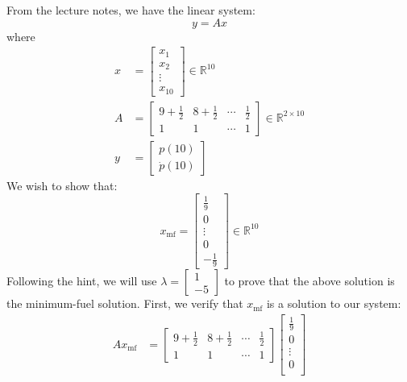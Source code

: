 \documentclass[12pt]{exam}
\begin{document}
\begin{questions}
\begin{solution}
    From the lecture notes, we have the linear system:
    \[
      y = Ax
    \]
    where 
    \begin{align*}
      x &=
        \begin{bmatrix}
          x_1 \\
          x_2 \\
          \vdots \\
          x_{10}
        \end{bmatrix} \in \mathbb{R}^{10}\\
      A &=
        \begin{bmatrix}
          9 + \frac{1}{2} & 8 + \frac{1}{2} & \cdots & \frac{1}{2} \\
          1 & 1 & \cdots & 1
        \end{bmatrix} \in \mathbb{R}^{2 \times 10} \\
      y &=
        \begin{bmatrix}
          p(10) \\
          \dot{p}(10)
        \end{bmatrix}
    \end{align*}
    We wish to show that:
    \[
      x_{\text{mf}} =
        \begin{bmatrix}
          \frac{1}{9} \\
          0 \\
          \vdots \\
          0 \\
          -\frac{1}{9}
        \end{bmatrix} \in \mathbb{R}^{10}
    \]
    Following the hint, we will use $\lambda = \begin{bmatrix} 1 \\ -5 \end{bmatrix}$ to prove that the above solution is the minimum-fuel solution. First, we verify that $x_{\text{mf}}$ is a solution to our system:
    \begin{align*}
      Ax_{\text{mf}} &=
        \begin{bmatrix}
          9 + \frac{1}{2} & 8 + \frac{1}{2} & \cdots & \frac{1}{2} \\
          1 & 1 & \cdots & 1
        \end{bmatrix}
        \begin{bmatrix}
          \frac{1}{9} \\
          0 \\
          \vdots \\
          0 \\

\end{bmatrix}
\end{align*}
\end{solution}
\end{questions}
\end{document}
